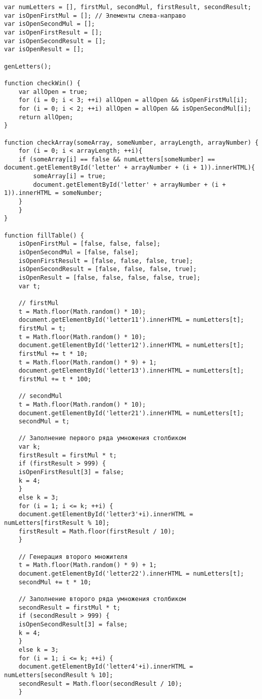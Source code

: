\begin{lstlisting}[caption=myScript.js]
var numLetters = [], firstMul, secondMul, firstResult, secondResult;
var isOpenFirstMul = []; // Элементы слева-направо
var isOpenSecondMul = [];
var isOpenFirstResult = [];
var isOpenSecondResult = [];
var isOpenResult = [];

genLetters();

function checkWin() {
    var allOpen = true;
    for (i = 0; i < 3; ++i) allOpen = allOpen && isOpenFirstMul[i];
    for (i = 0; i < 2; ++i) allOpen = allOpen && isOpenSecondMul[i];
    return allOpen;
}

function checkArray(someArray, someNumber, arrayLength, arrayNumber) {
    for (i = 0; i < arrayLength; ++i){
	if (someArray[i] == false && numLetters[someNumber] == document.getElementById('letter' + arrayNumber + (i + 1)).innerHTML){
	    someArray[i] = true;
	    document.getElementById('letter' + arrayNumber + (i + 1)).innerHTML = someNumber;
	}
    }
}

function fillTable() {
    isOpenFirstMul = [false, false, false];
    isOpenSecondMul = [false, false];
    isOpenFirstResult = [false, false, false, true];
    isOpenSecondResult = [false, false, false, true];
    isOpenResult = [false, false, false, false, true];
    var t;

    // firstMul
    t = Math.floor(Math.random() * 10);
    document.getElementById('letter11').innerHTML = numLetters[t];
    firstMul = t;
    t = Math.floor(Math.random() * 10);
    document.getElementById('letter12').innerHTML = numLetters[t];
    firstMul += t * 10;
    t = Math.floor(Math.random() * 9) + 1;
    document.getElementById('letter13').innerHTML = numLetters[t];
    firstMul += t * 100;

    // secondMul
    t = Math.floor(Math.random() * 10);
    document.getElementById('letter21').innerHTML = numLetters[t];
    secondMul = t;

    // Заполнение первого ряда умножения столбиком
    var k;
    firstResult = firstMul * t;
    if (firstResult > 999) {
	isOpenFirstResult[3] = false;
	k = 4;
    }
    else k = 3;
    for (i = 1; i <= k; ++i) {
	document.getElementById('letter3'+i).innerHTML = numLetters[firstResult % 10];
	firstResult = Math.floor(firstResult / 10);
    }

    // Генерация второго множителя
    t = Math.floor(Math.random() * 9) + 1;
    document.getElementById('letter22').innerHTML = numLetters[t];
    secondMul += t * 10;

    // Заполнение второго ряда умножения столбиком
    secondResult = firstMul * t;
    if (secondResult > 999) {
	isOpenSecondResult[3] = false;
	k = 4;
    }
    else k = 3;
    for (i = 1; i <= k; ++i) {
	document.getElementById('letter4'+i).innerHTML = numLetters[secondResult % 10];
	secondResult = Math.floor(secondResult / 10);
    }
    

\end{lstlisting}
